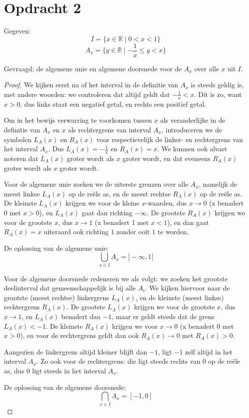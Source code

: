 \documentclass[hidequestions]{homework}
\begin{document}
\section*{Opdracht 2}

Gegeven: 
\[ I = \{x \in \mathbb{R} \mid  0<x<1\}\]
\[ A_x = \{ y \in \mathbb{R} \mid  -\frac{1}{x} \leq y < x \} \]

Gevraagd: de algemene unie en algemene doorsnede voor de $A_x$ over alle $x$ uit $I$. 

\begin{proof}

We kijken eerst na of het interval in de definitie van $A_x$ is steeds geldig is, met andere woorden: 
we controleren dat altijd geldt dat $-\frac{1}{x} < x$. Dit is zo, want $x>0$, dus links staat een negatief getal, en rechts een positief getal. 

Om in het bewijs verwarring te voorkomen tussen $x$ als veranderlijke in de definitie van $A_x$ en $x$ als rechtergrens van interval $A_x$, 
introduceren we de symbolen $L_A(x)$ en $R_A(x)$  voor respectievelijk de linker- en rechtergrens van het interval $A_x$. Dus $L_A(x) = -\frac{1}{x}$ en $R_A(x)=x$. We kunnen ook alvast noteren dat $L_A(x)$ groter wordt als $x$ groter wordt, en dat eveneens $R_A(x)$ groter wordt als $x$ groter wordt. 

Voor de algemene unie zoeken we de uiterste grenzen over alle $A_x$, namelijk 
de meest linkse $L_A(x)$ op de re\"ele as, en de meest rechtse $R_A(x)$ op de re\"ele as. 
De kleinste $L_A(x)$ krijgen we voor de kleine $x$-waarden, dus $x\rightarrow 0$ (x benadert 0 met $x>0$), en $L_A(x)$  gaat dan richting $-\infty$.  
De grootste $R_A(x)$ krijgen we voor de grootste $x$, dus $x\rightarrow 1$ (x benadert 1 met $x<1$), en dan gaat $R_A(x)=x$ uiteraard ook richting $1$ zonder ooit $1$ te worden. 

De oplossing van de algemene unie: 
\[ \bigcup_{x \in I} A_x  = ]-\infty,1[    \]

Voor de algemene doorsnede redeneren we als volgt: we zoeken het grootste deelinterval dat gemeenschappelijk is bij alle $A_i$. 
We kijken hiervoor naar de grootste (meest rechtse) linkergrens $L_A(x)$, en de kleinste (meest linkse) rechtergrens $R_A(x)$. 
De grootste $L_A(x)$ krijgen we voor de grootste $x$, dus $x\rightarrow 1$, en $L_A(x)$ benadert dan $-1$, maar er geldt steeds dat de grens $L_A(x)<-1$. De kleinste $R_A(x)$ krijgen we voor $x\rightarrow 0$ (x benadert 0 met $x>0$), en voor de rechtergrens geldt dan ook $R_A(x)\rightarrow 0$ met $R_A(x)>0$. 

Aangezien de linkergrens altijd kleiner blijft dan $-1$, ligt $-1$ zelf altijd in het interval $A_x$. Zo ook voor de rechtergrens: die ligt steeds rechts van $0$ op de re\"ele as, dus $0$ ligt steeds in het interval $A_x$. 

De oplossing van de algemene doorsnede: 
\[ \bigcap_{x \in I} A_x = [-1, 0] \]

\end{proof}
\end{document}
